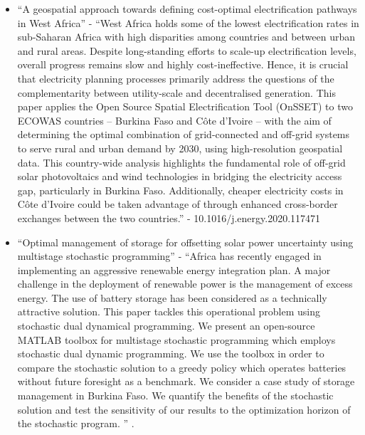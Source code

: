 \documentclass[conference, a4paper]{IEEEtran}
\begin{document}
\begin{itemize}
\item ``A geospatial approach towards defining cost-optimal electrification pathways in West Africa'' - ``West Africa holds some of the lowest electrification rates in sub-Saharan Africa with high disparities among countries and between urban and rural areas. Despite long-standing efforts to scale-up electrification levels, overall progress remains slow and highly cost-ineffective. Hence, it is crucial that electricity planning processes primarily address the questions of the complementarity between utility-scale and decentralised generation. This paper applies the Open Source Spatial Electrification Tool (OnSSET) to two ECOWAS countries – Burkina Faso and Côte d'Ivoire – with the aim of determining the optimal combination of grid-connected and off-grid systems to serve rural and urban demand by 2030, using high-resolution geospatial data. This country-wide analysis highlights the fundamental role of off-grid solar photovoltaics and wind technologies in bridging the electricity access gap, particularly in Burkina Faso. Additionally, cheaper electricity costs in Côte d'Ivoire could be taken advantage of through enhanced cross-border exchanges between the two countries.'' - 10.1016/j.energy.2020.117471
\item ``Optimal management of storage for offsetting solar power uncertainty using multistage stochastic programming'' - ``Africa has recently engaged in implementing an aggressive renewable energy integration plan. A major challenge in the deployment of renewable power is the management of excess energy. The use of battery storage has been considered as a technically attractive solution. This paper tackles this operational problem using stochastic dual dynamical programming. We present an open-source MATLAB toolbox for multistage stochastic programming which employs stochastic dual dynamic programming. We use the toolbox in order to compare the stochastic solution to a greedy policy which operates batteries without future foresight as a benchmark. We consider a case study of storage management in Burkina Faso. We quantify the benefits of the stochastic solution and test the sensitivity of our results to the optimization horizon of the stochastic program.  '' \cite{kaneda-scieur-ea-2018}.
  

\end{itemize}
\end{document}
